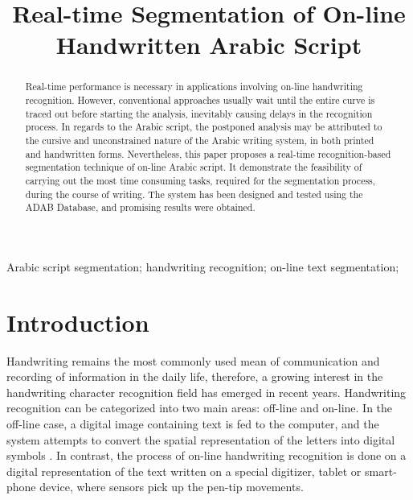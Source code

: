 \documentclass[10pt, conference, compsocconf]{IEEEtran}
\begin{document}
\title{Real-time Segmentation of On-line Handwritten Arabic Script}

\author{
\and
{}
}

\maketitle

\begin{abstract}
Real-time performance is necessary in applications involving on-line handwriting recognition. 
However, conventional approaches usually wait until the entire curve is traced out before starting the analysis, inevitably causing delays in the recognition process. 
In regards to the Arabic script, the postponed analysis may be attributed to the cursive and unconstrained nature of the Arabic writing system, in both printed and handwritten forms. 
Nevertheless, this paper proposes a real-time recognition-based segmentation technique of on-line Arabic script.
It demonstrate the feasibility of carrying out the most time consuming tasks, required for the segmentation process, during the course of writing. 
The system has been designed and tested using the ADAB Database, and promising results were obtained.\\
\end{abstract}

\begin{IEEEkeywords}
Arabic script segmentation; handwriting recognition; on-line text segmentation; 
\end{IEEEkeywords}

\section{Introduction}
Handwriting remains the most commonly used mean of communication and recording of information in the daily life, therefore, a growing interest in the handwriting character recognition field has emerged in recent years. 
Handwriting recognition can be categorized into two main areas: off-line and on-line. 
In the off-line case, a digital image containing text is fed to the computer, and the system attempts to convert the spatial representation of the letters into digital symbols \cite{al2011online}. 
In contrast, the process of on-line handwriting recognition is done on a digital representation of the text written on a special digitizer, tablet or smart-phone device, where sensors pick up the pen-tip movements.
 
\end{document}
